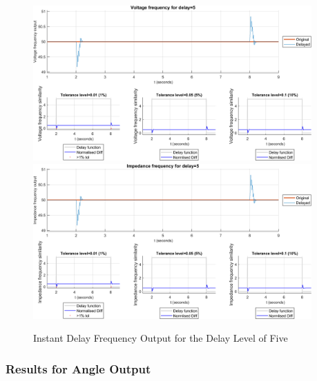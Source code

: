 \begin{figure}
    \caption{Instant Delay Frequency Output for the Delay Level of Five}
    \includegraphics[width=0.95\textwidth]{PMUsim-figures/DelayOf_5/Instant_vFrequency.png}    
    \label{fig:PMUsim_Five_vFrequency}
    \includegraphics[width=0.95\textwidth]{PMUsim-figures/DelayOf_5/Instant_iFrequency.png}    
    \label{fig:PMUsim_Five_Frequency}
        \begin{small}
     \end{small}
\end{figure}


\newpage \subsubsection{Results for Angle Output}



